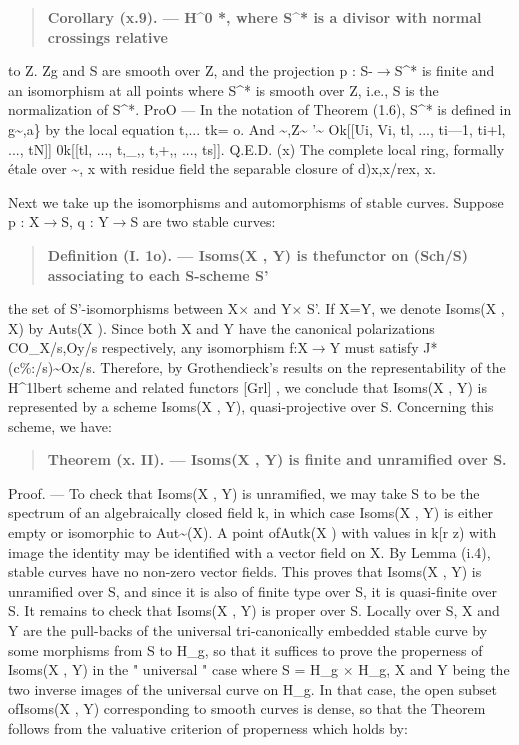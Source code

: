 \documentclass[11pt]{article}
\theoremstyle{plain}
\theoremstyle{definition}
\theoremstyle{remark}
\begin{document}
\begin{quote}\textbf{Corollary (x.9). --- H\textasciicircum{}0 *, where S\textasciicircum{}* is a divisor with normal crossings relative}\end{quote}
to Z. Zg and S are smooth over Z, and the projection p : S-$\to$S\textasciicircum{}* is finite and an isomorphism at all points where S\textasciicircum{}* is smooth over Z, i.e., S is the normalization of S\textasciicircum{}*. ProO --- In the notation of Theorem (1.6), S\textasciicircum{}* is defined in g\textasciitilde{},a\} by the local equation t,... tk= o. And \textasciitilde{},Z\textasciitilde{} '\textasciitilde{} Ok[[Ui, Vi, tl, ..., ti---1, ti+l, ..., tN]] 0k[[tl, ..., t,\_,, t,+,, ..., ts]]. Q.E.D. (x) The complete local ring, formally \'etale over \textasciitilde{}, x with residue field the separable closure of d)x,x/rex, x.

Next we take up the isomorphisms and automorphisms of stable curves. Suppose p : X$\to$S, q : Y$\to$S are two stable curves:

\begin{quote}\textbf{Definition (I. 1o). --- Isoms(X , Y) is thefunctor on (Sch/S) associating to each S-scheme S'}\end{quote}
the set of S'-isomorphisms between X$\times$ and Y$\times$ S'. If X=Y, we denote Isoms(X , X) by Auts(X ). Since both X and Y have the canonical polarizations CO\_X/s,Oy/s respectively, any isomorphism f:X$\to$Y must satisfy J*(c\%:/s)\textasciitilde{}Ox/s. Therefore, by Grothendieck's results on the representability of the H\textasciicircum{}1lbert scheme and related functors [Grl] , we conclude that Isoms(X , Y) is represented by a scheme Isoms(X , Y), quasi-projective over S. Concerning this scheme, we have:

\begin{quote}\textbf{Theorem (x. II). --- Isoms(X , Y) is finite and unramified over S.}\end{quote}
Proof. --- To check that Isoms(X , Y) is unramified, we may take S to be the spectrum of an algebraically closed field k, in which case Isoms(X , Y) is either empty or isomorphic to Aut\textasciitilde{}(X). A point ofAutk(X ) with values in k[r z) with image the identity may be identified with a vector field on X. By Lemma (i.4), stable curves have no non-zero vector fields. This proves that Isoms(X , Y) is unramified over S, and since it is also of finite type over S, it is quasi-finite over S. It remains to check that Isoms(X , Y) is proper over S. Locally over S, X and Y are the pull-backs of the universal tri-canonically embedded stable curve by some morphisms from S to H\_g, so that it suffices to prove the properness of Isoms(X , Y) in the " universal " case where S = H\_g $\times$ H\_g, X and Y being the two inverse images of the universal curve on H\_g. In that case, the open subset ofIsoms(X , Y) corresponding to smooth curves is dense, so that the Theorem follows from the valuative criterion of properness which holds by:
\end{document}
